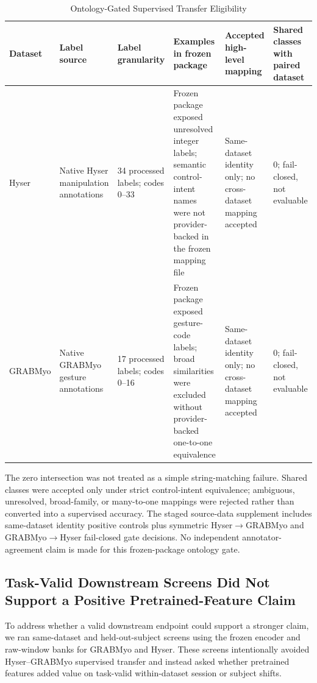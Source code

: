 \documentclass[journal]{IEEEtran}
\begin{document}
\begin{table}[t]
\caption{Ontology-Gated Supervised Transfer Eligibility}
\label{tab:ontologygate}
\centering
\footnotesize
\begin{tabularx}{\textwidth}{@{}p{1.55cm}p{2.35cm}p{2.35cm}p{2.35cm}p{2.65cm}p{2.05cm}@{}}
\toprule
Dataset & Label source & Label granularity & Examples in frozen package & Accepted high-level mapping & Shared classes with paired dataset \\
\midrule
Hyser & Native Hyser manipulation annotations & 34 processed labels; codes 0--33 & Frozen package exposed unresolved integer labels; semantic control-intent names were not provider-backed in the frozen mapping file & Same-dataset identity only; no cross-dataset mapping accepted & 0; fail-closed, not evaluable \\
GRABMyo & Native GRABMyo gesture annotations & 17 processed labels; codes 0--16 & Frozen package exposed gesture-code labels; broad similarities were excluded without provider-backed one-to-one equivalence & Same-dataset identity only; no cross-dataset mapping accepted & 0; fail-closed, not evaluable \\
\bottomrule
\end{tabularx}
\vspace{0.6em}
\parbox{\textwidth}{\footnotesize\raggedright The zero intersection was not treated as a simple string-matching failure. Shared classes were accepted only under strict control-intent equivalence; ambiguous, unresolved, broad-family, or many-to-one mappings were rejected rather than converted into a supervised accuracy. The staged source-data supplement includes same-dataset identity positive controls plus symmetric Hyser$\rightarrow$GRABMyo and GRABMyo$\rightarrow$Hyser fail-closed gate decisions. No independent annotator-agreement claim is made for this frozen-package ontology gate.}
\end{table}

\subsection{Task-Valid Downstream Screens Did Not Support a Positive Pretrained-Feature Claim}
To address whether a valid downstream endpoint could support a stronger claim, we ran same-dataset and held-out-subject screens using the frozen encoder and raw-window banks for GRABMyo and Hyser. These screens intentionally avoided Hyser--GRABMyo supervised transfer and instead asked whether pretrained features added value on task-valid within-dataset session or subject shifts.
\end{document}
